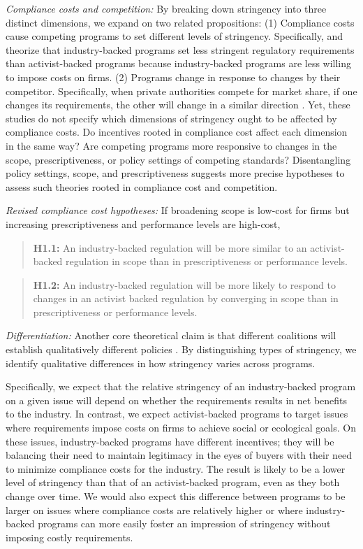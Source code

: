 \documentclass[
      12pt,
            Review ]{article}
\begin{document}
\emph{Compliance costs and competition:} By breaking down stringency
into three distinct dimensions, we expand on two related propositions:
(1) Compliance costs cause competing programs to set different levels of
stringency. Specifically, \citet{Cashore2004} and \citet{Fischer2014}
theorize that industry-backed programs set less stringent regulatory
requirements than activist-backed programs because industry-backed
programs are less willing to impose costs on firms. (2) Programs change
in response to changes by their competitor. Specifically, when private
authorities compete for market share, if one changes its requirements,
the other will change in a similar direction
\citep{Fischer2014, Smith2010}. Yet, these studies do not specify which
dimensions of stringency ought to be affected by compliance costs. Do
incentives rooted in compliance cost affect each dimension in the same
way? Are competing programs more responsive to changes in the scope,
prescriptiveness, or policy settings of competing standards?
Disentangling policy settings, scope, and prescriptiveness suggests more
precise hypotheses to assess such theories rooted in compliance cost and
competition.

\emph{Revised compliance cost hypotheses:} If broadening scope is
low-cost for firms but increasing prescriptiveness and performance
levels are high-cost,

\begin{quote}
\textbf{H1.1:} An industry-backed regulation will be more similar to an
activist-backed regulation in scope than in prescriptiveness or
performance levels.
\end{quote}

\begin{quote}
\textbf{H1.2:} An industry-backed regulation will be more likely to
respond to changes in an activist backed regulation by converging in
scope than in prescriptiveness or performance levels.
\end{quote}

\emph{Differentiation:} Another core theoretical claim is that different
coalitions will establish qualitatively different policies
\citep{Botzem2012, Hsueh2012}. By distinguishing types of stringency, we
identify qualitative differences in how stringency varies across
programs.

Specifically, we expect that the relative stringency of an
industry-backed program on a given issue will depend on whether the
requirements results in net benefits to the industry. In contrast, we
expect activist-backed programs to target issues where requirements
impose costs on firms to achieve social or ecological goals. On these
issues, industry-backed programs have different incentives; they will be
balancing their need to maintain legitimacy in the eyes of buyers with
their need to minimize compliance costs for the industry. The result is
likely to be a lower level of stringency than that of an activist-backed
program, even as they both change over time. We would also expect this
difference between programs to be larger on issues where compliance
costs are relatively higher or where industry-backed programs can more
easily foster an impression of stringency without imposing costly
requirements.
\end{document}
